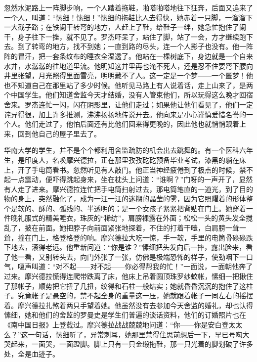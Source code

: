 \par 忽然水泥路上一阵脚步响，一个人踏着拖鞋，啪嗒啪嗒地往下狂奔，后面又追来了一个人，叫道：“愫细！愫细！”愫细的拖鞋比人去得快，她赤着一只脚，一溜溜下一大截子路；在铁阑干转弯的地方，人赶上了鞋，给鞋子一绊，她急忙抱住了阑干，身子往下一挫，就不见了。罗杰吓呆了，站住了脚，站了一会，方才继续跑下去。到了转弯的地方，找不到她；一直到路的尽头，连一个人影子也没有。他一阵阵的冒汗，把一套条纹布的睡衣全湿透了。他站在一棵树底下，身边就是一个自来水井，水潺潺的往地道里流。他明知这井里再也淹不死人，还是忍不住要弯下腰向井里张望，月光照得里面雪亮，明明藏不了人。这一定是一个梦——一个噩梦！他也不知道自己在那里站了多少时候。他听见马路上有人说着话，走上山来了，是两个中国学生。他们知道舍监今天才结婚，没有人管束他们，所以玩得这么晚才回宿舍来。罗杰连忙一闪，闪在阴影里，让他们走过；如果他让他们看见了，他们一定诧异得很，加上许多推测，沸沸扬扬地传说开去。他向来是小心谨慎爱惜名誉的一个人。他们走过了，他怕后面还有比他们回来得更晚的，因此他也就悄悄跟着上来，回到他自己的屋子里去了。
\par 华南大学的学生，并不是个个都利用舍监疏防的机会出去跳舞的。有一个医科六年生，是印度人，名唤摩兴德拉，正在那里孜孜矻矻预备毕业考试，漆黑的躺在床上，开了手电筒看书。忽然听见有人敲门。他正当神经疲倦到了极点的时候，禁不起一点震动，便吓得跳起身来，坐在枕头上问道：“谁啊？”门呀的一声开了，显然有人走了进来。摩兴德拉连忙把手电筒扫射过去，那电筒笔直的一道光，到了目的物的身上，突然融化了，成为一汪一汪的迷糊的晶莹的雾，因为它照耀着的形体整个是软的、酥的、弧线的、半透明的；是一个女孩子紧紧把背贴在门上。她穿着一件晚礼服式的精美睡衣，珠灰的“稀纺”，肩膀裸露在外面；松松一头的黄头发全搅乱了，披在前面。她把脖子向前面紧张地探着，不住的打着干噎，白肩膀一耸一耸，撞在门上，格登格登的响。摩兴德拉大吃一惊，手一软，手里的电筒骨碌碌跌下地去，滚得老远。他重新问道：“你是谁？”愫细把头发向后一摔，露出脸来，看了他一看，又别转头去，向门外张了一张，仿佛是极端恐怖的样子，使劲咽下一口气，嗄声叫道：“对不起——对不起——你必得帮我的忙！”一面说，一面朝他奔了过来。摩兴德拉慌得连爬带跌离了床，他床上吊着圆顶珠罗纱蚊帐，愫细一把揪住了那帐子，顺势把它扭了几扭，绞得和石柱一般结实；她就昏昏沉沉的抱住了这柱子。究竟帐子是悬空的，禁不起全身的重量这一压，她就跟着帐子一同左右的摇摆着。摩兴德拉扎煞着两只手望着她。他虽然没有去参加今天舍监的婚礼，却也认得愫细，她和他们的舍监的罗曼史是学生们普遍的谈话资料，他们的订婚照片也在《南中国日报》上登载过。摩兴德拉战战兢兢地问道：“你——你是安白登太太么？”这一句话，愫细听了，异常刺耳，她那里禁得住思前想后一下，早已号啕大哭起来，一面哭，一面蹬脚。脚上只有一只金缎拖鞋，那一只光着的脚划破了许多处，全是血迹子。
